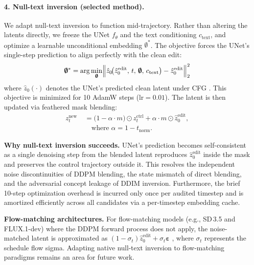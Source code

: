 \paragraph{4. Null-text inversion (selected method).}
We adapt null-text inversion \citep{mokady2023null} to function mid-trajectory. Rather than altering the latents directly, we freeze the UNet $f_\theta$ and the text conditioning $c_{\mathrm{text}}$, and optimize a learnable unconditional embedding $\boldsymbol{\emptyset}^*$. The objective forces the UNet's single-step prediction to align perfectly with the clean edit:
\begin{equation*}
  \boldsymbol{\emptyset}^{*} = \arg\min_{\boldsymbol{\emptyset}} \Bigl\| \hat{z}_0\!\bigl(\hat{z}_0^{\mathrm{edit}},\,t,\,\boldsymbol{\emptyset},\,c_{\mathrm{text}}\bigr) - \hat{z}_0^{\mathrm{edit}} \Bigr\|_2^2
\end{equation*}
where $\hat{z}_0(\cdot)$ denotes the UNet's predicted clean latent under CFG \citep{ho2022classifier}. This objective is minimized for 10 AdamW steps ($\mathrm{lr}{=}0.01$). The latent is then updated via feathered mask blending:
\begin{align*}
  z_t^{\mathrm{new}} &= \bigl(1-\alpha \cdot m\bigr)\odot z_t^{\mathrm{ctrl}} + \alpha \cdot m \odot \hat{z}_0^{\mathrm{edit}}, \\ \qquad
  &\quad \text{where } \alpha = 1-t_{\mathrm{norm}}.
\end{align*}

\textbf{Why null-text inversion succeeds.}
 UNet's prediction becomes self-consistent as a single denoising step from the blended latent reproduces $\hat{z}_0^{\mathrm{edit}}$ inside the mask and preserves the control trajectory outside it. This resolves the independent noise discontinuities of DDPM blending, the state mismatch of direct blending, and the adversarial concept leakage of DDIM inversion. Furthermore, the brief 10-step optimization overhead is incurred only once per audited timestep and is amortized efficiently across all candidates via a per-timestep embedding cache.

\textbf{Flow-matching architectures.}
For flow-matching models (e.g., SD\,3.5 and FLUX.1-dev) where the DDPM forward process does not apply, the noise-matched latent is approximated as $(1-\sigma_t)\hat{z}_0^{\mathrm{edit}} + \sigma_t\boldsymbol{\varepsilon}$ \citep{liu2023flow}, where $\sigma_t$ represents the schedule flow sigma. Adapting native null-text inversion to flow-matching paradigms remains an area for future work.

